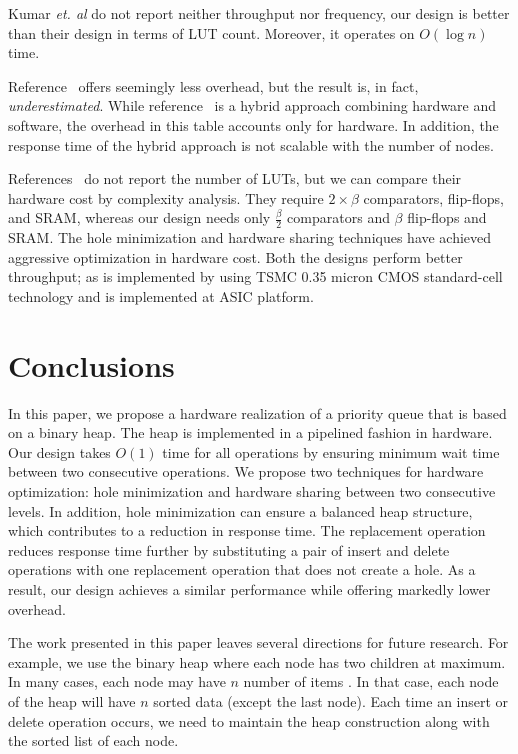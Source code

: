 \documentclass[10pt, conference, compsocconf]{IEEEtran}
\begin{document}
Kumar {\it et. al} \cite{hwsw1} do not report neither throughput nor frequency, our design is better than their design in terms of LUT count. Moreover, it operates on $O(\log n)$ time.

Reference~\cite{hw11} offers seemingly less overhead, but the result is, in fact, {\it underestimated}.
While reference~\cite{hw11} is a hybrid approach combining hardware and software, the overhead in this table accounts only for hardware.
In addition, the response time of the hybrid approach is not scalable with the number of nodes.

References~\cite{fpga1,hw2} do not report the number of LUTs, but we can compare their hardware cost by complexity analysis.
They require $2 \times \beta$ comparators, flip-flops, and SRAM, whereas our design needs only $\frac{\beta}{2}$ comparators and $\beta$ flip-flops and SRAM.
The hole minimization and hardware sharing techniques have achieved aggressive optimization in hardware cost. Both the designs perform better throughput; as \cite{hw2} is implemented by using TSMC
0.35  micron CMOS standard-cell technology and \cite{fpga1} is implemented at ASIC platform.



\section{Conclusions}

In this paper, we propose a hardware realization of a priority queue that is based on a binary heap.
The heap is implemented in a pipelined fashion in hardware.
Our design takes $O(1)$ time for all operations by ensuring minimum wait time between two consecutive operations.
We propose two techniques for hardware optimization: hole minimization and hardware sharing between two consecutive levels.
In addition, hole minimization can ensure a balanced heap structure, which contributes to a reduction in response time.
The replacement operation reduces response time further by substituting a pair of insert and delete operations with one replacement operation that does not create a hole.
As a result, our design achieves a similar performance while offering markedly lower overhead.

The work presented in this paper leaves several directions for future research. For example, we use the binary heap where each node has two children at maximum. In many cases, each node may have $n$ number of items \cite{pq3}. In that case, each node of the heap will have $n$ sorted data (except the last node). Each time an insert or delete operation occurs, we need to maintain the heap construction along with the sorted list of each node.
\end{document}
